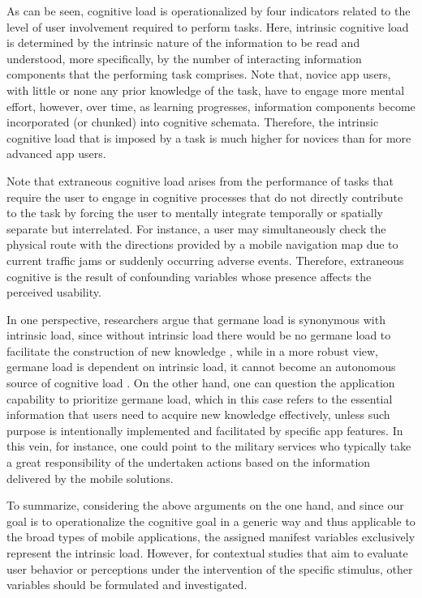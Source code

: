 \documentclass[preprint,12pt]{elsarticle}
\begin{document}

As can be seen, cognitive load is operationalized by four indicators related to the level of user involvement required to perform tasks.
Here, intrinsic cognitive load is determined by the intrinsic nature of the information to be read and understood, more specifically, by the number of interacting information components that the performing task comprises. Note that, novice app users, with little or none any prior knowledge of the task, have to engage more mental effort, however, over time, as learning progresses, information components become incorporated (or chunked) into cognitive schemata. Therefore, the intrinsic cognitive load that is imposed by a task is much higher for novices than for more advanced app users. 

Note that extraneous cognitive load arises from the performance of tasks that require the user to engage in cognitive processes that do not directly contribute to the task by forcing the user to mentally integrate temporally or spatially separate but interrelated. For instance, a user may simultaneously check the physical route with the directions provided by a mobile navigation map due to current traffic jams or suddenly occurring adverse events. Therefore, extraneous cognitive is the result of confounding variables whose presence affects the perceived usability. 

In one perspective, researchers argue that germane load is synonymous with intrinsic load, since without intrinsic load there would be no germane load to facilitate the construction of new knowledge \cite{greenberg2023revisiting}, while in a more robust view, germane load is dependent on intrinsic load, it cannot become an autonomous source of cognitive load \cite{leppink2015evolution}. On the other hand, one can question the application capability to prioritize germane load, which in this case refers to the essential information that users need to acquire new knowledge effectively, unless such purpose is intentionally implemented and facilitated by specific app features. In this vein, for instance, one could point to the military services who typically take a great responsibility of the undertaken actions based on the information delivered by the mobile solutions. 

To summarize, considering the above arguments on the one hand, and since our goal is to operationalize the cognitive goal in a generic way and thus applicable to the broad types of mobile applications, the assigned manifest variables exclusively represent the intrinsic load. However, for contextual studies that aim to evaluate user behavior or perceptions under the intervention of the specific stimulus, other variables should be formulated and investigated.
\end{document}

